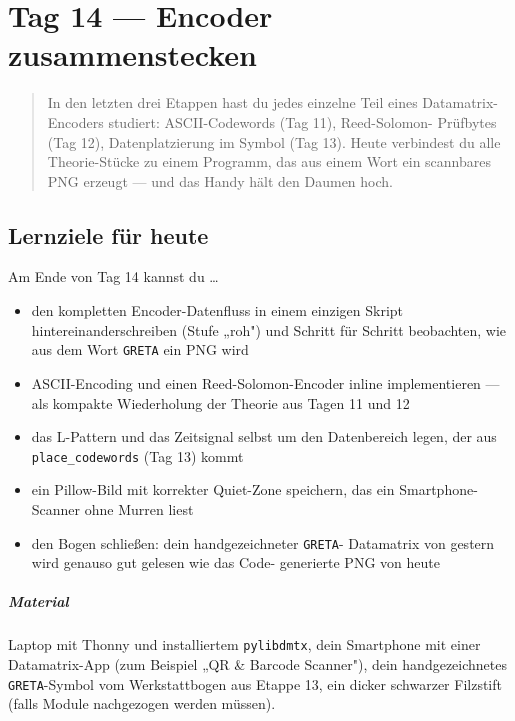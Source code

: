 \chapter{Tag 14 — Encoder zusammenstecken}

\begin{quote}
In den letzten drei Etappen hast du jedes einzelne Teil eines
Datamatrix-Encoders studiert: ASCII-Codewords (Tag 11), Reed-Solomon-
Prüfbytes (Tag 12), Datenplatzierung im Symbol (Tag 13). Heute
verbindest du alle Theorie-Stücke zu einem Programm, das aus einem
Wort ein scannbares PNG erzeugt — und das Handy hält den
Daumen hoch.
\end{quote}

\section*{Lernziele für heute}

Am Ende von Tag 14 kannst du \dots

\begin{itemize}
\item den kompletten Encoder-Datenfluss in einem einzigen Skript
  hintereinanderschreiben (Stufe „roh") und Schritt für Schritt
  beobachten, wie aus dem Wort \texttt{GRETA} ein PNG wird
\item ASCII-Encoding und einen Reed-Solomon-Encoder inline
  implementieren — als kompakte Wiederholung der Theorie aus
  Tagen 11 und 12
\item das L-Pattern und das Zeitsignal selbst um den Datenbereich
  legen, der aus \texttt{place\_codewords} (Tag 13) kommt
\item ein Pillow-Bild mit korrekter Quiet-Zone speichern, das ein
  Smartphone-Scanner ohne Murren liest
\item den Bogen schließen: dein handgezeichneter \texttt{GRETA}-
  Datamatrix von gestern wird genauso gut gelesen wie das Code-
  generierte PNG von heute
\end{itemize}

\paragraph{Material} Laptop mit Thonny und installiertem
\texttt{pylibdmtx}, dein Smartphone mit einer Datamatrix-App
(zum Beispiel „QR \& Barcode Scanner"), dein
handgezeichnetes \texttt{GRETA}-Symbol vom Werkstattbogen aus
Etappe 13, ein dicker schwarzer Filzstift (falls Module nachgezogen
werden müssen).

